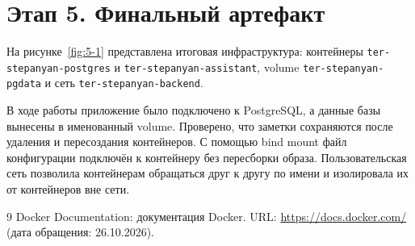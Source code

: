 
\section{Этап 5. Финальный артефакт}

На рисунке~\ref{fig:5-1} представлена итоговая инфраструктура: контейнеры
\texttt{ter-stepanyan-postgres} и \texttt{ter-stepanyan-assistant}, volume
\texttt{ter-stepanyan-pgdata} и сеть \texttt{ter-stepanyan-backend}.



В ходе работы приложение было подключено к PostgreSQL, а данные базы
вынесены в именованный volume. Проверено, что заметки сохраняются после
удаления и пересоздания контейнеров. С помощью bind mount файл
конфигурации подключён к контейнеру без пересборки образа. Пользовательская
сеть позволила контейнерам обращаться друг к другу по имени и изолировала
их от контейнеров вне сети.

\begin{thebibliography}{9}
  Docker Documentation: документация Docker.
  URL: \url{https://docs.docker.com/}
  (дата обращения: 26.10.2026).
\end{thebibliography}
